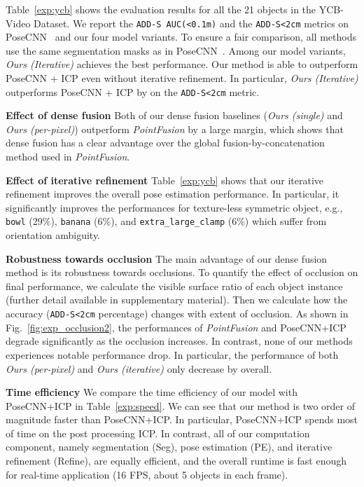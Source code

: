 \documentclass[10pt,twocolumn,letterpaper]{article}
\begin{document}
Table~\ref{exp:ycb} shows the evaluation results for all the 21 objects in the YCB-Video Dataset. We report the \texttt{ADD-S AUC(<0.1m)} and the \texttt{ADD-S<2cm} metrics on PoseCNN~\cite{xiang2017posecnn} and our four model variants.  To ensure a fair comparison, all methods use the same segmentation masks as in PoseCNN~\cite{xiang2017posecnn}. Among our model variants, \textit{Ours (Iterative)} achieves the best performance. Our method is able to outperform PoseCNN + ICP\cite{xiang2017posecnn} even without iterative refinement. In particular, \textit{Ours (Iterative)} outperforms PoseCNN + ICP by  on the \texttt{ADD-S<2cm} metric.

\noindent\textbf{Effect of dense fusion} Both of our dense fusion baselines (\textit{Ours (single)} and \textit{Ours (per-pixel)}) outperform \textit{PointFusion} by a large margin, which shows that dense fusion has a clear advantage over the global fusion-by-concatenation method used in \textit{PointFusion}. 

\noindent\textbf{Effect of iterative refinement} Table~\ref{exp:ycb} shows that our iterative refinement improves the overall pose estimation performance. In particular, it significantly improves the performances for texture-less symmetric object, e.g., \texttt{bowl} (29\%), \texttt{banana} (6\%), and \texttt{extra\_large\_clamp} (6\%) which suffer from orientation ambiguity.

\noindent\textbf{Robustness towards occlusion} The main advantage of our dense fusion method is its robustness towards occlusions. To quantify the effect of occlusion on final performance, we calculate the visible surface ratio of each object instance (further detail available in supplementary material). Then we calculate how the accuracy (\texttt{ADD-S<2cm} percentage) changes with extent of occlusion. As shown in Fig.~\ref{fig:exp_occlusion2}, the performances of \textit{PointFusion} and PoseCNN+ICP degrade significantly as the occlusion increases. In contrast, none of our methods experiences notable performance drop. In particular, the performance of both \textit{Ours (per-pixel)} and \textit{Ours (iterative)} only decrease by  overall.

\noindent\textbf{Time efficiency} 
We compare the time efficiency of our model with PoseCNN+ICP in Table~\ref{exp:speed}. We can see that our method is two order of magnitude faster than PoseCNN+ICP. In particular, PoseCNN+ICP spends most of time on the post processing ICP. In contrast, all of our computation component, namely segmentation (Seg), pose estimation (PE), and iterative refinement (Refine), are equally efficient, and the overall runtime is fast enough for real-time application (16 FPS, about 5 objects in each frame).
\end{document}
